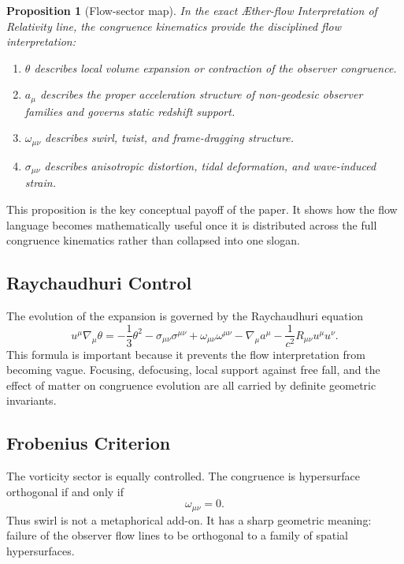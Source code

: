 \documentclass[11pt]{article}
\newcommand{\Aflow}{\AE{}ther-flow}
\newcommand{\TheoryName}{\Aflow{} Interpretation of Relativity}
\newtheorem{proposition}{Proposition}
\begin{document}
\begin{proposition}[Flow-sector map]
In the exact \TheoryName{} line, the congruence kinematics provide the disciplined flow interpretation:
\begin{enumerate}
    \item \(\theta\) describes local volume expansion or contraction of the observer congruence.
    \item \(a_\mu\) describes the proper acceleration structure of non-geodesic observer families and governs static redshift support.
    \item \(\omega_{\mu\nu}\) describes swirl, twist, and frame-dragging structure.
    \item \(\sigma_{\mu\nu}\) describes anisotropic distortion, tidal deformation, and wave-induced strain.
\end{enumerate}
\end{proposition}

This proposition is the key conceptual payoff of the paper. It shows how the flow language becomes mathematically useful once it is distributed across the full congruence kinematics rather than collapsed into one slogan.

\subsection{Raychaudhuri Control}

The evolution of the expansion is governed by the Raychaudhuri equation
\begin{equation}
u^\mu \nabla_\mu \theta
=
-\frac{1}{3}\theta^2
-\sigma_{\mu\nu}\sigma^{\mu\nu}
+\omega_{\mu\nu}\omega^{\mu\nu}
-\nabla_\mu a^\mu
-\frac{1}{c^2}R_{\mu\nu}u^\mu u^\nu.
\label{eq:raychaudhuri}
\end{equation}
This formula is important because it prevents the flow interpretation from becoming vague. Focusing, defocusing, local support against free fall, and the effect of matter on congruence evolution are all carried by definite geometric invariants.

\subsection{Frobenius Criterion}

The vorticity sector is equally controlled. The congruence is hypersurface orthogonal if and only if
\begin{equation}
\omega_{\mu\nu}=0.
\label{eq:frobenius}
\end{equation}
Thus swirl is not a metaphorical add-on. It has a sharp geometric meaning: failure of the observer flow lines to be orthogonal to a family of spatial hypersurfaces.
\end{document}
